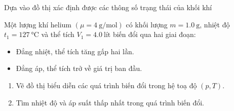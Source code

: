 \begin{dang}{Dựa vào đồ thị xác định được các thông số trạng thái của khối khí}
	{Một lượng khí helium $\left(\mu=\SI{4}{\gram/\mole}\right)$ có khối lượng $m=\SI{1.0}{\gram}$, nhiệt độ $t_1=\SI{127}{\celsius}$ và thể tích $V_1=\SI{4.0}{\text{lít}}$ biến đổi qua hai giai đoạn:
		\begin{itemize}
			\item Đẳng nhiệt, thể tích tăng gấp hai lần.
			\item Đẳng áp, thể tích trở về giá trị ban đầu.
		\end{itemize}
		\begin{enumerate}[label=\alph*)]
			\item Vẽ đồ thị biểu diễn các quá trình biến đổi trong hệ toạ độ $\left(p, T\right)$.
			\item Tìm nhiệt độ và áp suất thấp nhất trong quá trình biến đổi.
		\end{enumerate}
		
}
\end{dang}
